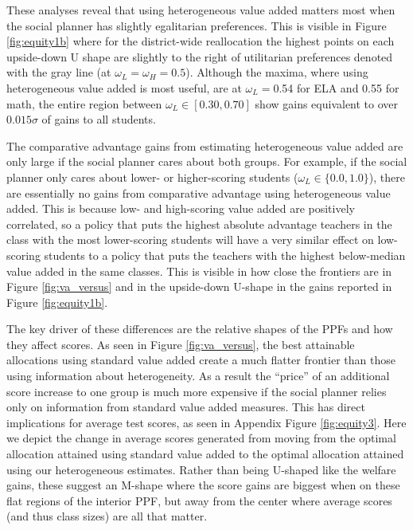\documentclass[12pt]{article}
\theoremstyle{definition}
\theoremstyle{definition}
\theoremstyle{definition}
\theoremstyle{definition}
\begin{document}
These analyses reveal that using heterogeneous value added matters most when the social planner has slightly egalitarian preferences. This is visible in Figure \ref{fig:equity1b} where for the district-wide reallocation the highest points on each upside-down U shape are slightly to the right of utilitarian preferences denoted with the gray line (at $\omega_L=\omega_H=0.5$). Although the maxima, where using heterogeneous value added is most useful, are at $\omega_L=$0.54 for ELA and 0.55 for math, the entire region between $\omega_L\in[0.30,0.70]$ show gains equivalent to over $0.015\sigma$ of gains to all students. 


The comparative advantage gains from estimating heterogeneous value added are only large if the social planner cares about both groups. For example, if the social planner only cares about lower- or higher-scoring students ($\omega_L\in\{0.0,1.0\}$), there are essentially no gains from comparative advantage using heterogeneous value added. This is because low- and high-scoring value added are positively correlated, so a policy that puts the highest absolute advantage teachers in the class with the most lower-scoring students will have a very similar effect on low-scoring students to a policy that puts the teachers with the highest below-median value added in the same classes. This is visible in how close the frontiers are in Figure \ref{fig:va_versus} and in the upside-down U-shape in the gains reported in Figure \ref{fig:equity1b}.


The key driver of these differences are the relative shapes of the PPFs and how they affect scores. As seen in Figure \ref{fig:va_versus}, the best attainable allocations using standard value added create a much flatter frontier than those using information about heterogeneity. As a result the ``price'' of an additional score increase to one group is much more expensive if the social planner relies only on information from standard value added measures. This has direct implications for average test scores, as seen in Appendix Figure \ref{fig:equity3}. Here we depict the change in average scores generated from moving from the optimal allocation attained using standard value added to the optimal allocation attained using our heterogeneous estimates. Rather than being U-shaped like the welfare gains, these suggest an M-shape where the score gains are biggest when on these flat regions of the interior PPF, but away from the center where average scores (and thus class sizes) are all that matter.
\end{document}
